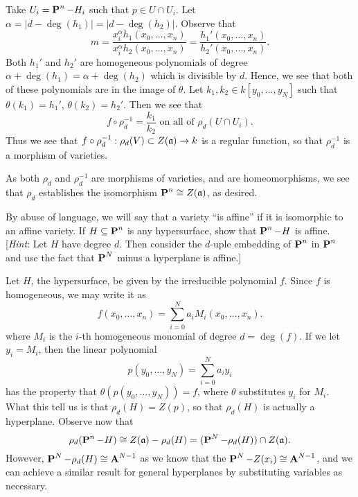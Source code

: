 \documentclass[10pt]{amsart}
\begin{document}
\begin{solution}
\begin{luke}
\begin{itemize}[itemsep=2pt, label={\textbullet}]
            Take $U_i = \operatorname{\mathbf{P}}^n - H_i$ such that $p \in U \cap U_i$. Let 
            $\alpha = |d - \deg(h_1)| = |d - \deg(h_2)|$.  
            Observe that 
            \[
                m = \frac{x_i^{\alpha}h_1(x_0, \dots, x_n)}{x_i^{\alpha}h_2(x_0, \dots, x_n)} = \frac{h_1'(x_0, \dots, x_n)}{h_2'(x_0, \dots, x_n)}.
            \]
            Both $h_1'$ and $h_2'$ are homogeneous polynomials 
            of degree $\alpha + \deg(h_1) = \alpha + \deg(h_2)$ which is divisible by $d$.
            Hence, we see that both of these polynomials are in the image of $\theta$. 
            Let $k_1, k_2 \in k[y_0, \dots, y_N]$ such that $\theta(k_1) = h_1'$, $\theta(k_2) = h_2'$.
            Then we see that 
            \[
                f \circ \rho_d^{-1} = \frac{k_1}{k_2} \text{ on all of } \rho_d(U \cap U_i).
            \]
            Thus we see that $f \circ \rho_d^{-1}: \rho_d(V) \subset Z(\mathfrak{a}) \to k$ is a regular function, so that 
            $\rho_d^{-1}$ is a morphism of varieties. 
        \end{itemize}
        As both $\rho_d$ and $\rho_d^{-1}$ are morphisms 
        of varieties, and are homeomorphisms, we see that $\rho_d$ establishes the isomorphism 
        $\operatorname{\mathbf{P}}^n \cong Z(\mathfrak{a})$, as desired. 
    \end{luke}
\end{solution}

\begin{exercise}[3.5]
    By abuse of language, we will say that a variety ``is affine'' if it is 
    isomorphic to an affine variety. If $H \subseteq \operatorname{\mathbf{P}}^n$ is any hypersurface, 
    show that $\operatorname{\mathbf{P}}^n - H$ is affine. 
    [\emph{Hint}: Let $H$ have degree $d$. Then consider the $d$-uple 
    embedding of $\operatorname{\mathbf{P}}^n$ in $\operatorname{\mathbf{P}}^n$ and use the fact that $\operatorname{\mathbf{P}}^N$ minus 
    a hyperplane is affine.]
\end{exercise}

\begin{solution}
    \begin{luke}
        Let $H$, the hypersurface, be given by the irreducible polynomial $f$. 
        Since $f$ is homogeneous, we may write it as 
        \[
            f(x_0, \dots, x_n) = \sum_{i = 0}^{N}a_iM_i(x_0, \dots, x_n).  
        \]
        where $M_i$ is the $i$-th homogeneous monomial of degree $d = \deg(f)$.
        If we let $y_i = M_i$, then the linear polynomial 
        \[
            p(y_0, \dots, y_N) = \sum_{i = 0}^{N}a_iy_i    
        \]
        has the property that $\theta(p(y_0, \dots, y_N)) = f$, 
        where $\theta$ substitutes $y_i$ for $M_i$. What this tell us is that 
        $\rho_d(H) = Z(p)$, so that $\rho_d(H)$ is actually a hyperplane. 
        Observe now that 
        \[
            \rho_d(\operatorname{\mathbf{P}}^n - H) \cong Z(\mathfrak{a}) - \rho_d(H) = (\operatorname{\mathbf{P}}^N - \rho_d(H)) \cap Z(\mathfrak{a}).
        \]
        However, $\operatorname{\mathbf{P}}^N - \rho_d(H) \cong \operatorname{\mathbf{A}}^{N-1}$ as we know that the $\operatorname{\mathbf{P}}^N - Z(x_i) \cong \operatorname{\mathbf{A}}^{N-1}$, 
        and we can achieve a similar result for general hyperplanes by substituting 
        variables as necessary. 

    \end{luke}
\end{solution}
\end{document}
